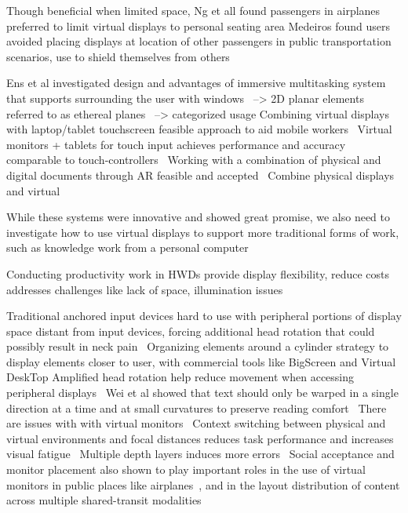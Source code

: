 Though beneficial when limited space, Ng et all found passengers in airplanes preferred to limit virtual displays to personal seating area \cite{ng2021passengerexperiencemrairplane} 
Medeiros found users avoided placing displays at location of other passengers in public transportation scenarios, use to shield themselves from others ~\cite{medeiros2022shieldingar} 

Ens et al investigated design and advantages of immersive multitasking system that supports surrounding the user with windows~\cite{ens2014personalcockpit} --> 2D planar elements referred to as ethereal planes~\cite{ens2014ethereal} --> categorized usage 
Combining virtual displays with laptop/tablet touchscreen feasible approach to aid mobile workers~\cite{biener2020breakingscreen} 
Virtual monitors + tablets for touch input achieves performance and accuracy comparable to touch-controllers~\cite{le2021vxslate} 
Working with a combination of physical and digital documents through AR feasible and accepted~\cite{li2019holodoc} 
Combine physical displays and virtual 

While these systems were innovative and showed great promise, we also need to investigate how to use virtual displays to support more traditional forms of work, such as knowledge work from a personal computer~\cite{pavanatto2024multiplemonitors}

Conducting productivity work in HWDs provide display flexibility, reduce costs~\cite{pavanatto2021virtualmonitor} 
addresses challenges like lack of space, illumination issues

Traditional anchored input devices hard to use with peripheral portions of display space distant from input devices, forcing additional head rotation that could possibly result in neck pain~\cite{gruber2018officefuture} 
Organizing elements around a cylinder strategy to display elements closer to user, with commercial tools like BigScreen and Virtual DeskTop 
Amplified head rotation help reduce movement when accessing peripheral displays~\cite{mcgill2020seatedvrworkspace}
Wei et al showed that text should only be warped in a single direction at a time and at small curvatures to preserve reading comfort~\cite{wei2020reading} 
There are issues with with virtual monitors~\cite{pavanatto2024multiplemonitors}
Context switching between physical and virtual environments and focal distances reduces task performance and increases visual fatigue~\cite{gabbard2019arcontextswitch}
Multiple depth layers induces more errors~\cite{eiberger2019depth}
Social acceptance and monitor placement also shown to play important roles in the use of virtual monitors in public places like airplanes~\cite{ng2021passengerexperiencemrairplane},
and in the layout distribution of content across multiple shared-transit modalities~\cite{medeiros2022shieldingar} 

